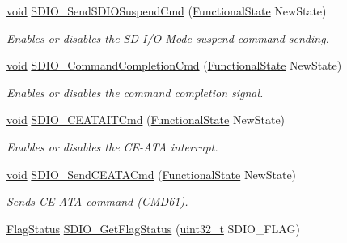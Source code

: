 \begin{DoxyCompactItemize}
\hyperlink{usb__devapi_8h_afabf60e7f57651d6d595a02c75f07cd0}{void} \hyperlink{group___s_d_i_o___private___functions_ga9264137a01a1ab81d03bc80a3b3120fc}{S\+D\+I\+O\+\_\+\+Send\+S\+D\+I\+O\+Suspend\+Cmd} (\hyperlink{agilefox_2library_2inc_2stm32f10x__type_8h_ac9a7e9a35d2513ec15c3b537aaa4fba1}{Functional\+State} New\+State)
\begin{DoxyCompactList}\small\item\em Enables or disables the SD I/O Mode suspend command sending. \end{DoxyCompactList}\item 
\hyperlink{usb__devapi_8h_afabf60e7f57651d6d595a02c75f07cd0}{void} \hyperlink{group___s_d_i_o___private___functions_ga1bbe98c629812bc62121d9c8b2c5e21b}{S\+D\+I\+O\+\_\+\+Command\+Completion\+Cmd} (\hyperlink{agilefox_2library_2inc_2stm32f10x__type_8h_ac9a7e9a35d2513ec15c3b537aaa4fba1}{Functional\+State} New\+State)
\begin{DoxyCompactList}\small\item\em Enables or disables the command completion signal. \end{DoxyCompactList}\item 
\hyperlink{usb__devapi_8h_afabf60e7f57651d6d595a02c75f07cd0}{void} \hyperlink{group___s_d_i_o___private___functions_gab44b8cbc21be000a291563076159503b}{S\+D\+I\+O\+\_\+\+C\+E\+A\+T\+A\+I\+T\+Cmd} (\hyperlink{agilefox_2library_2inc_2stm32f10x__type_8h_ac9a7e9a35d2513ec15c3b537aaa4fba1}{Functional\+State} New\+State)
\begin{DoxyCompactList}\small\item\em Enables or disables the C\+E-\/\+A\+TA interrupt. \end{DoxyCompactList}\item 
\hyperlink{usb__devapi_8h_afabf60e7f57651d6d595a02c75f07cd0}{void} \hyperlink{group___s_d_i_o___private___functions_ga8dc7f17804bdb745b42f6647c8487b4c}{S\+D\+I\+O\+\_\+\+Send\+C\+E\+A\+T\+A\+Cmd} (\hyperlink{agilefox_2library_2inc_2stm32f10x__type_8h_ac9a7e9a35d2513ec15c3b537aaa4fba1}{Functional\+State} New\+State)
\begin{DoxyCompactList}\small\item\em Sends C\+E-\/\+A\+TA command (C\+M\+D61). \end{DoxyCompactList}\item 
\hyperlink{agilefox_2library_2inc_2stm32f10x__type_8h_a89136caac2e14c55151f527ac02daaff}{Flag\+Status} \hyperlink{group___s_d_i_o___private___functions_ga644514b4b3c95c5c4326d99cd166f6f9}{S\+D\+I\+O\+\_\+\+Get\+Flag\+Status} (\hyperlink{_p_e___types_8h_a33594304e786b158f3fb30289278f5af}{uint32\+\_\+t} S\+D\+I\+O\+\_\+\+F\+L\+AG)

\end{DoxyCompactItemize}
